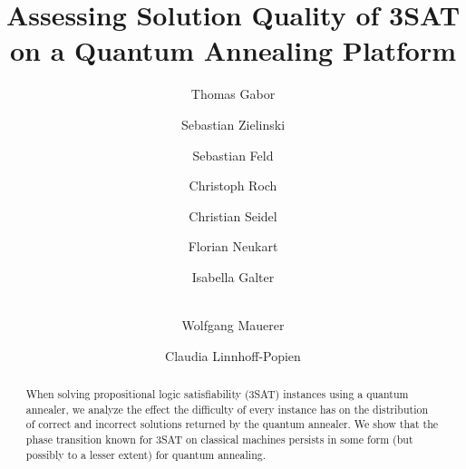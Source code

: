 \documentclass[runningheads]{llncs}
\begin{document}
%
\title{Assessing Solution Quality of 3SAT\\on a Quantum Annealing Platform}
%
%
\author{Thomas Gabor \and
Sebastian Zielinski \and
Sebastian Feld \and
Christoph Roch \and
Christian Seidel \and
Florian Neukart \and
Isabella Galter \and\\
Wolfgang Mauerer \and
Claudia Linnhoff-Popien}
%
%
%
\maketitle              %
%
\begin{abstract}
When solving propositional logic satisfiability (3SAT) instances using a quantum annealer, we analyze the effect the difficulty of every instance has on the distribution of correct and incorrect solutions returned by the quantum annealer. We show that the phase transition known for 3SAT on classical machines persists in some form (but possibly to a lesser extent) for quantum annealing.

\end{abstract}
%
%
%






%
%
%


%
\end{document}

